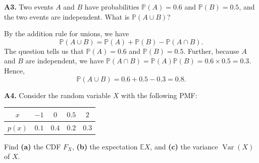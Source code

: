 \documentclass[
  a4paper,
]{book}
\theoremstyle{definition}
\theoremstyle{definition}
\theoremstyle{definition}
\theoremstyle{definition}
\theoremstyle{remark}
\begin{document}
\textbf{A3.} Two events \(A\) and \(B\) have probabilities \(\mathbb P(A) = 0.6\) and \(\mathbb P(B) = 0.5\), and the two events are independent. What is \(\mathbb P(A \cup B)\)?

\begin{myanswers}
By the addition rule for unions, we have
\[ \mathbb P(A \cup B) = \mathbb P(A) + \mathbb P(B) - \mathbb P(A \cap B) . \]
The question tells us that \(\mathbb P(A) = 0.6\) and \(\mathbb P(B) = 0.5\). Further, because \(A\) and \(B\) are independent, we have \(\mathbb P(A \cap B) = \mathbb P(A)\mathbb P(B) = 0.6 \times 0.5 = 0.3\). Hence,
\[ \mathbb P(A \cup B) = 0.6 + 0.5 - 0.3 = 0.8 . \]

\end{myanswers}

\textbf{A4.} Consider the random variable \(X\) with the following PMF:

\begin{longtable}[]{@{}ccccc@{}}
\toprule()
\(x\) & \(-1\) & \(0\) & \(0.5\) & \(2\) \\
\midrule()
\endhead
\(p(x)\) & \(0.1\) & \(0.4\) & \(0.2\) & \(0.3\) \\
\bottomrule()
\end{longtable}

Find \textbf{(a)} the CDF \(F_X\), \textbf{(b)} the expectation \(\mathbb EX\), and \textbf{(c)} the variance \(\operatorname{Var}(X)\) of \(X\).
\end{document}
